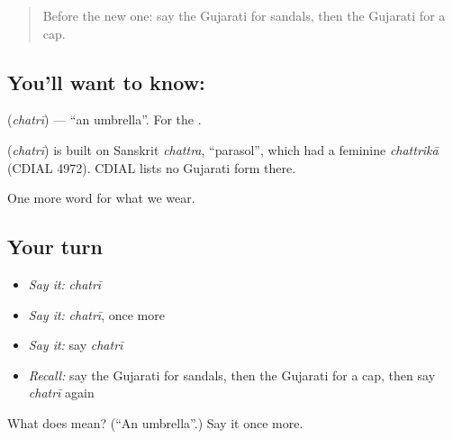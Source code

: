 \label{lesson:GU-C87-umbrella}



\begin{quote}
Before the new one: say the Gujarati for sandals, then the Gujarati for a cap.
\end{quote}

\subsection*{You'll want to know: }
\textbf{} (\emph{chatrī}) — \textquotedblleft{}an umbrella\textquotedblright{}. For the \textbf{}.

\begin{cousinweb}
\textbf{} (\emph{chatrī}) is built on Sanskrit \emph{chattra}, \textquotedblleft{}parasol\textquotedblright{}, which had a feminine \emph{chattrikā} (CDIAL 4972). CDIAL lists no Gujarati form there.
\end{cousinweb}

\begin{grammarlens}[title={What you've built}]
One more word for what we wear.
\end{grammarlens}

\subsection*{Your turn}
\begin{itemize}
\raggedright
  \item \emph{Say it:} \emph{chatrī}
  \item \emph{Say it:} \emph{chatrī}, once more
  \item \emph{Say it:} say \emph{chatrī}
  \item \emph{Recall:} say the Gujarati for sandals, then the Gujarati for a cap, then say \emph{chatrī} again
\end{itemize}

\begin{tcolorbox}[breakable,colback=teal!4,colframe=teal!35!black,title={Before you move on}]
What does  mean? (\textquotedblleft{}An umbrella\textquotedblright{}.) Say it once more.
\end{tcolorbox}
